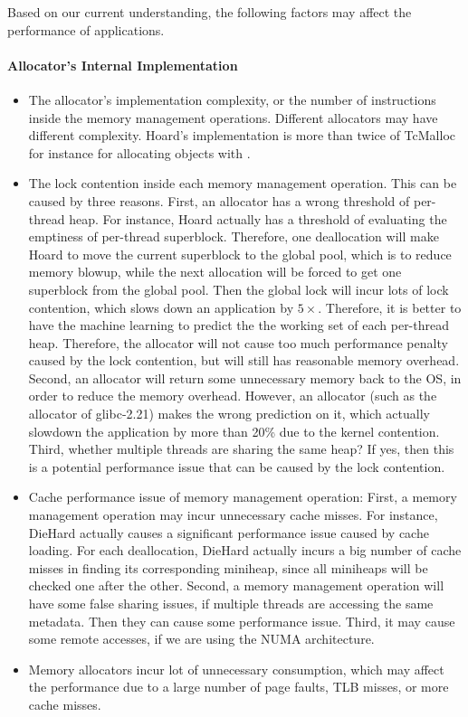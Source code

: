 Based on our current understanding, the following factors may affect the performance of applications. 

\paragraph{Allocator's Internal Implementation}

\begin{itemize}

\item The allocator's implementation complexity, or the number of instructions inside the memory management operations. Different allocators may have different complexity. Hoard's implementation is more than twice of TcMalloc for instance for allocating objects with . 

\item The lock contention inside each memory management operation. This can be caused by three reasons. First, an allocator has a wrong threshold of per-thread heap. For instance, Hoard actually has a threshold of evaluating the emptiness of per-thread superblock. Therefore, one deallocation will make Hoard to move the current superblock to the global pool, which is to reduce memory blowup, while the next allocation will be forced to get one superblock from the global pool. Then the global lock will incur lots of lock contention, which slows down an application by $5\times$. Therefore, it is better to have the machine learning to predict the  the working set of each per-thread heap. Therefore, the allocator will not cause too much performance penalty caused by the lock contention, but will still has reasonable memory overhead. Second, an allocator will return some unnecessary memory back to the OS, in order to reduce the memory overhead. However, an allocator (such as the allocator of glibc-2.21) makes the wrong prediction on it, which actually slowdown the application by more than 20\% due to the kernel contention. Third, whether multiple threads are sharing the same heap? If yes, then this is a potential performance issue that can be caused by the lock contention. 

\item Cache performance issue of memory management operation: First, a memory management operation may incur unnecessary cache misses. For instance, DieHard actually causes a significant performance issue caused by cache loading. For each deallocation, DieHard actually incurs a big number of cache misses in finding its corresponding miniheap, since all miniheaps will be checked one after the other. Second, a memory management operation will have some false sharing issues, if multiple threads are accessing the same metadata. Then they can cause some performance issue. 
	Third, it may cause some remote accesses, if we are using the NUMA architecture.
\item Memory allocators incur lot of unnecessary consumption, which may affect the performance due to a large number of page faults, TLB misses, or more cache misses. 
\end{itemize}

